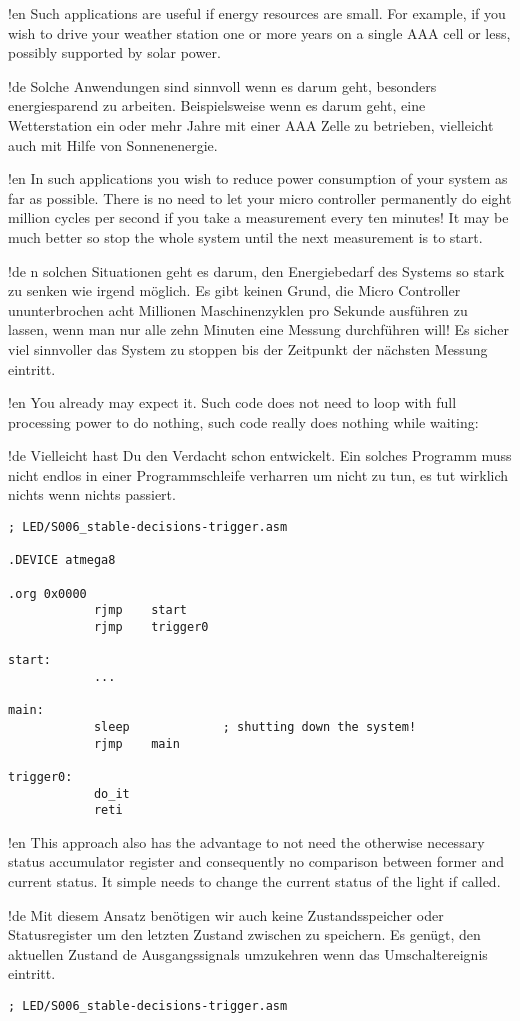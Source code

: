 !en Such applications are useful if energy resources are small. For example, if you wish to drive your weather station one or more years on a single AAA cell or less, possibly supported by solar power.

!de Solche Anwendungen sind sinnvoll wenn es darum geht, besonders energiesparend zu arbeiten. Beispielsweise wenn es darum geht, eine Wetterstation ein oder mehr Jahre mit einer AAA Zelle zu betrieben, vielleicht auch mit Hilfe von Sonnenenergie.



!en In such applications you wish to reduce power consumption of your system as far as possible. There is no need to let your micro controller permanently do eight million cycles per second if you take a measurement every ten minutes! It may be much better so stop the whole system until the next measurement is to start.


!de n solchen Situationen geht es darum, den Energiebedarf des Systems so stark zu senken wie irgend möglich. Es gibt keinen Grund, die Micro Controller ununterbrochen acht Millionen Maschinenzyklen pro Sekunde ausführen zu lassen, wenn man nur alle zehn Minuten eine Messung durchführen will! Es sicher viel sinnvoller das System zu stoppen bis der Zeitpunkt der nächsten Messung eintritt.



!en You already may expect it. Such code does not need to loop with full processing power to do nothing, such code really does nothing while waiting:

!de Vielleicht hast Du den Verdacht schon entwickelt. Ein solches Programm muss nicht endlos in einer Programmschleife verharren um nicht zu tun, es tut wirklich nichts wenn nichts passiert.



\begin{lstlisting}
; LED/S006_stable-decisions-trigger.asm

.DEVICE atmega8

.org 0x0000
            rjmp    start
            rjmp    trigger0
            
start:
            ...
            
main:
            sleep             ; shutting down the system!
            rjmp    main

trigger0:
            do_it
            reti
\end{lstlisting}

!en This approach also has the advantage to not need the otherwise necessary status accumulator register and consequently no comparison between former and current status. It simple needs to change the current status of the light if called.

!de Mit diesem Ansatz benötigen wir auch keine Zustandsspeicher oder Statusregister um den letzten Zustand zwischen zu speichern. Es genügt, den aktuellen Zustand de Ausgangssignals umzukehren wenn das Umschaltereignis eintritt.

\begin{lstlisting}
; LED/S006_stable-decisions-trigger.asm
\end{lstlisting}


